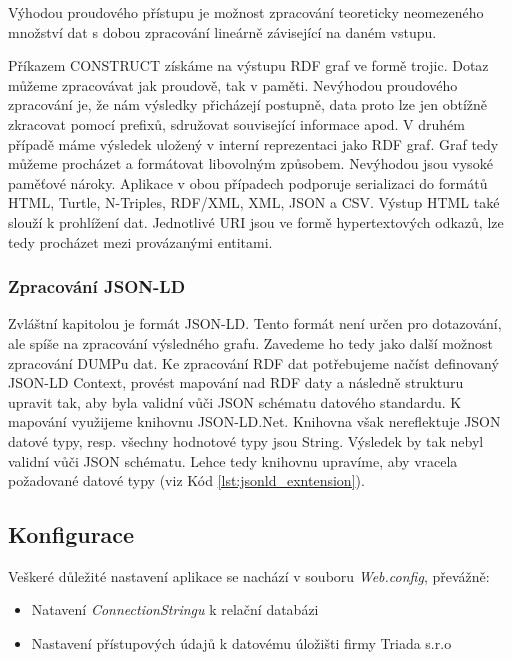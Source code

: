 Výhodou proudového přístupu je možnost zpracování teoreticky neomezeného množství dat s dobou zpracování lineárně závisející na daném vstupu.

Příkazem CONSTRUCT získáme na výstupu RDF graf ve formě trojic. Dotaz můžeme zpracovávat jak proudově, tak v paměti. Nevýhodou proudového zpracování je, že nám výsledky přicházejí postupně, data proto lze jen obtížně zkracovat pomocí prefixů, sdružovat související informace apod. V druhém případě máme výsledek uložený v interní reprezentaci jako RDF graf. Graf tedy můžeme procházet a formátovat libovolným způsobem. Nevýhodou jsou vysoké paměťové nároky. Aplikace v obou případech podporuje serializaci do formátů HTML, Turtle, N-Triples, RDF/XML, XML, JSON a CSV. Výstup HTML také slouží k prohlížení dat. Jednotlivé URI jsou ve formě hypertextových odkazů, lze tedy procházet mezi provázanými entitami.

\subsubsection*{Zpracování JSON-LD}

Zvláštní kapitolou je formát JSON-LD. Tento formát není určen pro dotazování, ale spíše na zpracování výsledného grafu. Zavedeme ho tedy jako další možnost zpracování DUMPu dat. Ke zpracování RDF dat potřebujeme načíst definovaný JSON-LD Context, provést mapování nad RDF daty a následně strukturu upravit tak, aby byla validní vůči JSON schématu datového standardu. K mapování využijeme knihovnu JSON-LD.Net. Knihovna však nereflektuje JSON datové typy, resp. všechny hodnotové typy jsou String. Výsledek by tak nebyl validní vůči JSON schématu. Lehce tedy knihovnu upravíme, aby vracela požadované datové typy (viz Kód \ref{lst:jsonld_exntension}).



\subsection{Konfigurace}

Veškeré důležité nastavení aplikace se nachází v souboru \textit{Web.config}, převážně:

\begin{itemize}
\item Natavení \textit{ConnectionStringu} k relační databázi
\item Nastavení přístupových údajů k datovému úložišti firmy Triada s.r.o
\end{itemize}

